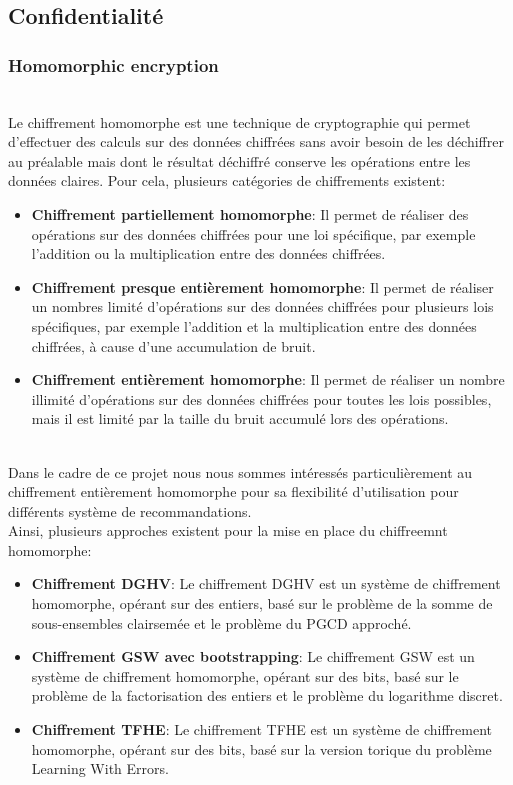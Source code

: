 \documentclass{article}
\begin{document}
\subsection{Confidentialité}
\subsubsection{Homomorphic encryption}
$ $\\
Le chiffrement homomorphe est une technique de cryptographie qui permet d'effectuer des calculs sur des données chiffrées sans avoir besoin de les déchiffrer au préalable mais dont le résultat déchiffré conserve les opérations entre les données claires.
Pour cela, plusieurs catégories de chiffrements existent:\\
\begin{itemize}
    \item \textbf{Chiffrement partiellement homomorphe}: Il permet de réaliser des opérations sur des données chiffrées pour une loi spécifique, par exemple l'addition ou la multiplication entre des données chiffrées.
    \item \textbf{Chiffrement presque entièrement homomorphe}: Il permet de réaliser un nombres limité d'opérations sur des données chiffrées pour plusieurs lois spécifiques, par exemple l'addition et la multiplication entre des données chiffrées, à cause d'une accumulation de bruit.
    \item \textbf{Chiffrement entièrement homomorphe}: Il permet de réaliser un nombre illimité d'opérations sur des données chiffrées pour toutes les lois possibles, mais il est limité par la taille du bruit accumulé lors des opérations.
\end{itemize}
$ $\\
Dans le cadre de ce projet nous nous sommes intéressés particulièrement au chiffrement entièrement homomorphe pour sa flexibilité d'utilisation pour différents système de recommandations.\\
Ainsi, plusieurs approches existent pour la mise en place du chiffreemnt homomorphe: \\
\begin{itemize}
    \item \textbf{Chiffrement DGHV}: Le chiffrement DGHV est un système de chiffrement homomorphe, opérant sur des entiers, basé sur le problème de la somme de sous-ensembles clairsemée et le problème du PGCD approché.
    \item \textbf{Chiffrement GSW avec bootstrapping}: Le chiffrement GSW est un système de chiffrement homomorphe, opérant sur des bits, basé sur le problème de la factorisation des entiers et le problème du logarithme discret.
    \item \textbf{Chiffrement TFHE}: Le chiffrement TFHE est un système de chiffrement homomorphe, opérant sur des bits, basé sur la version torique du problème Learning With Errors.
\end{itemize}
\end{document}
